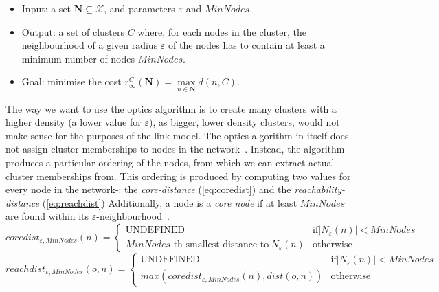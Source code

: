 \begin{itemize}
    \item Input: a set $\textbf{N} \subseteq \mathcal{X}$, and parameters $\varepsilon$ and $MinNodes$.
    \item Output: a set of clusters $C$ where, for each nodes in the cluster, the neighbourhood of a given radius $\varepsilon$ of the nodes has to contain at least a minimum number of nodes $MinNodes$.
    \item Goal: minimise the cost $r^C_\infty(\textbf{N}) = \max\limits_{n \in \textbf{N}} d(n, C)$.
\end{itemize}

The way we want to use the \gls{optics} algorithm is to create many clusters with a higher density (a lower value for $\varepsilon$), as bigger, lower density clusters, would not make sense for the purposes of the link model. The \gls{optics} algorithm in itself does not assign cluster memberships to nodes in the network~\cite[p.~52]{Ankerst:1999:OOP:304182.304187}. Instead, the algorithm produces a particular ordering of the nodes, from which we can extract actual cluster memberships from. This ordering is produced by computing two values for every node in the network-: the \textit{core-distance} (\autoref{eq:coredist}) and the \textit{reachability-distance} (\autoref{eq:reachdist}) Additionally, a node is a \textit{core node} if at least $MinNodes$ are found within its $\varepsilon$-neighbourhood~\cite[p.~52]{Ankerst:1999:OOP:304182.304187}. 
\begin{equation}\label{eq:coredist}
    coredist_{\varepsilon,MinNodes}(n) = 
    \begin{cases}
        \text{UNDEFINED} & \text{if} |N_\varepsilon(n)| < MinNodes \\
        MinNodes\text{-th smallest distance to}\ N_\varepsilon(n) & \text{otherwise}
    \end{cases}
\end{equation}
\begin{equation}\label{eq:reachdist}
    reachdist_{\varepsilon,MinNodes}(o, n) = 
    \begin{cases}
        \text{UNDEFINED} & \text{if} |N_\varepsilon(n)| < MinNodes \\
        max(coredist_{\varepsilon,MinNodes}(n), dist(o, n)) & \text{otherwise}
    \end{cases}
\end{equation}


